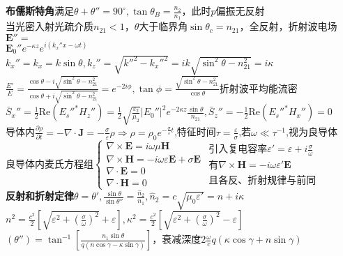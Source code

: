 \documentclass[10pt,a4paper]{article}
\begin{document}
\begin{multicols}{2}
\textbf{布儒斯特角}满足$\theta+\theta''=90^{\circ},\tan\theta_B=\frac{n_2}{n_1}$，此时$p$偏振无反射\\
当光密入射光疏介质$n_{21}<1$，$\theta$大于临界角$\sin\theta_c=n_{21}$，全反射，折射波电场$\bm{E}''=$\\
\indent$\bm{E}_0''e^{-\kappa z}e^{i(k_x''x-\omega t)}$~$k_x''=k_x=k\sin\theta,k_z''=\sqrt{k''^2-k_x''^2}=ik\sqrt{\sin^2\theta-n_{21}^2}=i\kappa$\scriptsize\\
$\frac{E'}{E}=\frac{\cos\theta-i\sqrt{\sin^2\theta-n_{21}^2}}{\cos\theta+i\sqrt{\sin^2\theta-n_{21}^2}}=e^{-2i\phi},\tan\phi=\frac{\sqrt{\sin^2\theta-n_{21}^2}}{\cos\theta}$折射波平均能流密\\
$\bar{S}_x''=\frac{1}{2}\text{Re}(E_s''^*H_z'')=\frac{1}{2}\sqrt{\frac{\varepsilon_2}{\mu_2}}|E_0''|^2e^{-2\kappa z}\frac{\sin\theta}{n_{21}},\bar{S}_z''=-\frac{1}{2}\text{Re}(E_s''^*H_x'')=0$\\
导体内$\frac{\partial\rho}{\partial t}=-\nabla\cdot\bm{J}=-\frac{\sigma}{\varepsilon}\rho\Rightarrow\rho=\rho_0e^{-\frac{\sigma}{\varepsilon}t}$,特征时间$\tau=\frac{\varepsilon}{\sigma}$,若$\omega\ll\tau^{-1}$,视为良导体\\
良导体内麦氏方程组$\left\{\begin{array}{l}\nabla\times\bm{E}=i\omega\mu\bm{H}\\\nabla\times\bm{H}=-i\omega\varepsilon\bm{E}+\sigma\bm{E}\\\nabla\cdot\bm{E}=0\\\nabla\cdot\bm{H}=0\end{array}\right.\left.\begin{array}{l}\text{引入复电容率}\varepsilon'=\varepsilon+i\frac{\sigma}{\omega}\\\text{有}\nabla\times\bm{H}=-i\omega\varepsilon'\bm{E}\\\text{且各反、折射规律与前同}\end{array}\right.$\\
\textbf{反射和折射定律}$\theta=\theta',\frac{\sin\theta}{\sin\theta''}=\frac{\hat{n}_2}{n_1},\hat{n}_2=c\sqrt{\mu_0\varepsilon'}=n+i\kappa$\\
\indent{}$n^2=\frac{c^2}{2}[\sqrt{\varepsilon^2+(\frac{\sigma}{\omega})^2}+\varepsilon],\kappa^2=\frac{c^2}{2}[\sqrt{\varepsilon^2+(\frac{\sigma}{\omega})^2}-\varepsilon]$\\
$(\theta'')=\tan^{-1}[\frac{n_1\sin\theta}{q(n\cos\gamma-\kappa\sin\gamma)}]$，衰减深度$2\frac{\omega}{c}q(\kappa\cos\gamma+n\sin\gamma)$\\

\end{multicols}
\end{document}
